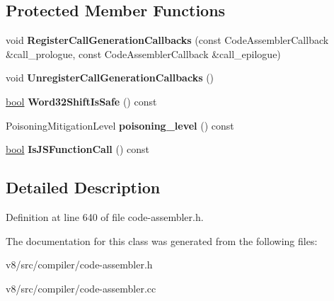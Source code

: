 \subsection*{Protected Member Functions}
\begin{DoxyCompactItemize}
\item 
\mbox{\label{classv8_1_1internal_1_1compiler_1_1CodeAssembler_a5a41f8ead2a06c5a96371069b090eb0d}} 
void {\bfseries Register\+Call\+Generation\+Callbacks} (const Code\+Assembler\+Callback \&call\+\_\+prologue, const Code\+Assembler\+Callback \&call\+\_\+epilogue)
\item 
\mbox{\label{classv8_1_1internal_1_1compiler_1_1CodeAssembler_a4957528396149b6554d2cf71b5b2eea6}} 
void {\bfseries Unregister\+Call\+Generation\+Callbacks} ()
\item 
\mbox{\label{classv8_1_1internal_1_1compiler_1_1CodeAssembler_af83a5c391c64915dab687a9c546c8ffb}} 
\mbox{\hyperlink{classbool}{bool}} {\bfseries Word32\+Shift\+Is\+Safe} () const
\item 
\mbox{\label{classv8_1_1internal_1_1compiler_1_1CodeAssembler_a2e74db52bb1204f8a3312be8dd03b5f3}} 
Poisoning\+Mitigation\+Level {\bfseries poisoning\+\_\+level} () const
\item 
\mbox{\label{classv8_1_1internal_1_1compiler_1_1CodeAssembler_a53bffb65c6a852eafa69b17dab6a70b5}} 
\mbox{\hyperlink{classbool}{bool}} {\bfseries Is\+J\+S\+Function\+Call} () const
\end{DoxyCompactItemize}


\subsection{Detailed Description}


Definition at line 640 of file code-\/assembler.\+h.



The documentation for this class was generated from the following files\+:\begin{DoxyCompactItemize}
\item 
v8/src/compiler/code-\/assembler.\+h\item 
v8/src/compiler/code-\/assembler.\+cc\end{DoxyCompactItemize}
